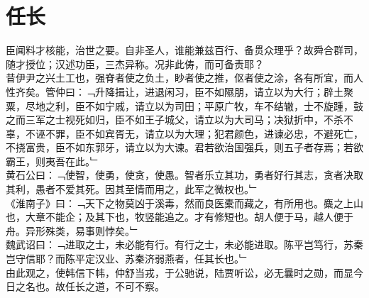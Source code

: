 \chapter{任长}%
臣闻料才核能，治世之要。自非圣人，谁能兼兹百行、备贯众理乎？故舜合群司，随才授位；汉述功臣，三杰异称。况非此俦，而可备责耶？
\\
昔伊尹之兴土工也，强脊者使之负土，眇者使之推，伛者使之涂，各有所宜，而人性齐矣。管仲曰：﹁升降揖让，进退闲习，臣不如隰朋，请立以为大行；辟土聚粟，尽地之利，臣不如宁戚，请立以为司田；平原广牧，车不结辙，士不旋踵，鼓之而三军之士视死如归，臣不如王子城父，请立以为大司马；决狱折中，不杀不辜，不诬不罪，臣不如宾胥无，请立以为大理；犯君颜色，进谏必忠，不避死亡，不挠富贵，臣不如东郭牙，请立以为大谏。君若欲治国强兵，则五子者存焉；若欲霸王，则夷吾在此。﹂\\
黄石公曰：﹁使智，使勇，使贪，使愚。智者乐立其功，勇者好行其志，贪者决取其利，愚者不爱其死。因其至情而用之，此军之微权也。﹂\\
《淮南子》曰：﹁天下之物莫凶于溪毒，然而良医橐而藏之，有所用也。麋之上山也，大章不能企；及其下也，牧竖能追之。才有修短也。胡人便于马，越人便于舟。异形殊类，易事则悖矣。﹂\\
魏武诏曰：﹁进取之士，未必能有行。有行之士，未必能进取。陈平岂笃行，苏秦岂守信耶？而陈平定汉业、苏秦济弱燕者，任其长也。﹂\\
由此观之，使韩信下帏，仲舒当戎，于公驰说，陆贾听讼，必无曩时之勋，而显今日之名也。故任长之道，不可不察。
\\%
%
